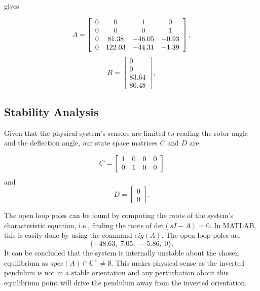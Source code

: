 gives

\[
    A =
    \left[\begin{array}{c c c c}
            0 & 0      & 1      & 0     \\
            0 & 0      & 0      & 1     \\
            0 & 81.38  & -46.05 & -0.93 \\
            0 & 122.03 & -44.31 & -1.39
        \end{array}\right],
\]
\[
    B =
    \left[\begin{array}{c}
            0     \\
            0     \\
            83.64 \\
            80.48
        \end{array}\right],
\]

\subsection{Stability Analysis}
Given that the physical system’s sensors are limited to reading the rotor angle
and the deflection angle, our state space matrices \(C\) and \(D\) are

\[
    C =
    \left[\begin{array}{c c c c}
            1 & 0 & 0 & 0 \\
            0 & 1 & 0 & 0
        \end{array}\right]
\]
and
\[
    D =
    \left[\begin{array}{c}
            0 \\
            0
        \end{array}\right].
\]

The open loop poles can be found by computing the roots of the system's characteristic equation, i.e., finding the roots of $\text{det}(sI-A)=0$. In MATLAB, this is easily done by using the command $eig(A)$. The open-loop poles are
\[
    \{-48.63, \; 7.05, \; -5.86, \; 0\}.
\]
It can be concluded that the system is internally unstable about the chosen equilibrium as $\text{spec}(A) \cap \mathbb{C}^+ \not = \emptyset $. This makes physical sense as the inverted pendulum is not in a stable orientation and any perturbation about this equilibrium point will drive the pendulum away from the inverted orientation.

